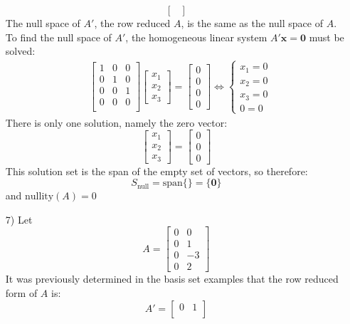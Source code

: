\documentclass{article}
\begin{document}
\begin{itemize}
\[\begin{bmatrix}
\end{bmatrix}\]
The null space of \(A'\), the row reduced \(A\), is the same as the null space of \(A\). To find the null space of \(A'\), the homogeneous linear system \(A'\mathbf{x} = \mathbf{0}\) must be solved:
\begin{align*}
& \begin{bmatrix}
1 & 0 & 0 \\
0 & 1 & 0 \\
0 & 0 & 1 \\
0 & 0 & 0 \\ 
\end{bmatrix}\begin{bmatrix} x_1 \\ x_2 \\ x_3 \end{bmatrix} = \begin{bmatrix} 0 \\ 0 \\ 0 \\ 0 \end{bmatrix} 
\iff \left\{\begin{array}{c}
x_1 = 0 \\ 
x_2 = 0 \\ 
x_3 = 0 \\ 
0 = 0 
\end{array}\right.
\end{align*}
There is only one solution, namely the zero vector:
\[\begin{bmatrix} x_1 \\ x_2 \\ x_3 \end{bmatrix} = \begin{bmatrix} 0 \\ 0 \\ 0 \end{bmatrix}\]
This solution set is the span of the empty set of vectors, so therefore:
\[S_{\text{null}} = \text{span}\{\} = \{\mathbf{0}\}\]
and \(\text{nullity}(A) = 0\)
\item[7)] Let \[A = \begin{bmatrix}
0 &  0 \\
0 &  1 \\
0 & -3 \\ 
0 &  2
\end{bmatrix}\]
It was previously determined in the basis set examples that the row reduced form of \(A\) is: 
\[A' = \begin{bmatrix}
0 & 1 \\

\end{bmatrix}\]
\end{itemize}
\end{document}
